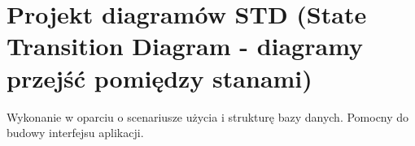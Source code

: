 \section{Projekt diagramów STD (State Transition Diagram - diagramy przejść pomiędzy
stanami)}
Wykonanie w oparciu o scenariusze użycia i strukturę bazy danych. Pomocny do
budowy interfejsu aplikacji.